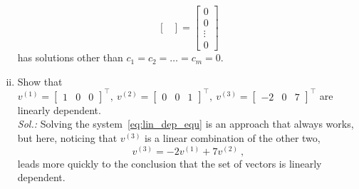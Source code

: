 \begin{example}
\begin{enumerate}[(i)]
\begin{equation}
\begin{bmatrix}
	\end{bmatrix} = \begin{bmatrix}
	0 \\ 0 \\ \vdots \\ 0
	\end{bmatrix}
	\end{equation}
	has solutions other than $c_1=c_2=\ldots=c_m=0$.
	\item Show that $v^{(1)} = \begin{bmatrix}
	1 & 0 & 0
	\end{bmatrix}^\top, \: v^{(2)} = \begin{bmatrix}
	0 & 0 & 1
	\end{bmatrix}^\top, \: v^{(3)} = \begin{bmatrix}
	-2 & 0 & 7
	\end{bmatrix}^\top$ are linearly dependent. \\
	{\it Sol.:}
	Solving the system~\eqref{eq:lin_dep_equ} is an approach that always works, but here, noticing that $v^{(3)}$ is a linear combination of the other two,
	\[v^{(3)} = -2v^{(1)}+7v^{(2)} \:, \]
	leads more quickly to the conclusion that the set of vectors is linearly dependent.
\end{enumerate}
\end{example}

